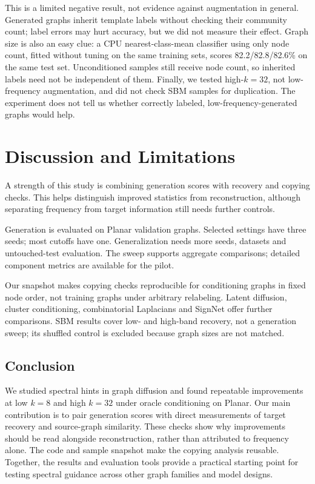 \documentclass[11pt]{article}
\begin{document}
This is a limited negative result, not evidence against augmentation in general. Generated
graphs inherit template labels without checking their community count; label errors may hurt
accuracy, but we did not measure their effect. Graph size is also an easy clue: a CPU
nearest-class-mean classifier using only node count, fitted without tuning on the same
training sets, scores 82.2/82.8/82.6\% on the same test set. Unconditioned samples still
receive node count, so inherited labels need not be independent of them. Finally, we tested
high-$k{=}32$, not low-frequency augmentation, and did not check SBM samples for duplication.
The experiment does not tell us whether correctly labeled, low-frequency-generated graphs
would help.

\section{Discussion and Limitations}
\label{sec:discussion}
A strength of this study is combining generation scores with recovery and copying checks.
This helps distinguish improved statistics from reconstruction, although separating frequency
from target information still needs further controls.

Generation is evaluated on Planar validation graphs. Selected settings have three seeds;
most cutoffs have one. Generalization needs more seeds, datasets and untouched-test evaluation.
The sweep supports aggregate comparisons; detailed component metrics are available for the pilot.

Our snapshot makes copying checks reproducible for conditioning graphs in fixed node order,
not training graphs under arbitrary relabeling. Latent diffusion, cluster conditioning,
combinatorial Laplacians and SignNet offer further comparisons. SBM results cover low- and
high-band recovery, not a generation sweep; its shuffled control is excluded because graph
sizes are not matched.

\begin{samepage}
\section{Conclusion}
We studied spectral hints in graph diffusion and found repeatable improvements at low
$k{=}8$ and high $k{=}32$ under oracle conditioning on Planar. Our main contribution is to
pair generation scores with direct measurements of target recovery and source-graph
similarity. These checks show why improvements should be read alongside reconstruction,
rather than attributed to frequency alone. The code and sample snapshot make the copying
analysis reusable. Together, the results and evaluation tools provide a practical starting
point for testing spectral guidance across other graph families and model designs.
\par
\end{samepage}

\clearpage

\end{document}
